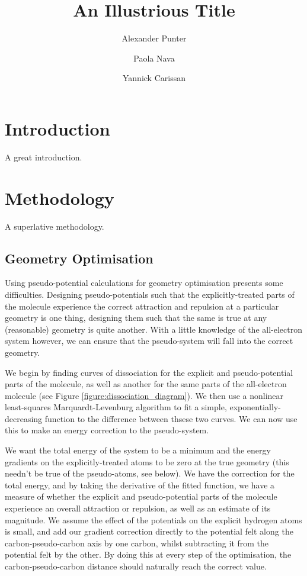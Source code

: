 \documentclass[aip,reprint]{revtex4-1}
\begin{document}
\title{An Illustrious Title}
\author{Alexander Punter}
\author{Paola Nava}
\author{Yannick Carissan}

\maketitle

\section{Introduction}

A great introduction.

\section{Methodology}

A superlative methodology.

\subsection*{\sffamily \large Geometry Optimisation}
\label{section:geometry_optimisation}		    		  
  Using pseudo-potential calculations for geometry optimisation presents some difficulties. Designing pseudo-potentials such that the explicitly-treated parts of the molecule experience the correct attraction and repulsion at a particular geometry is one thing, designing them such that the same is true at any (reasonable) geometry is quite another. With a little knowledge of the all-electron system however, we can ensure that the pseudo-system will fall into the correct geometry.	
 		 
 We begin by finding curves of dissociation for the explicit and pseudo-potential parts of the molecule, as well as another for the same parts of the all-electron molecule (see Figure \ref{figure:dissociation_diagram}). We then use a nonlinear least-squares Marquardt-Levenburg algorithm to fit a simple, exponentially-decreasing function to the difference between thsese two curves. We can now use this to make an energy correction to the pseudo-system. 		 
  		  
 We want the total energy of the system to be a minimum and the energy gradients on the explicitly-treated atoms to be zero at the true geometry (this needn't be true of the pseudo-atoms, see below). We have the correction for the total energy, and by taking the derivative of the fitted function, we have a measure of whether the explicit and pseudo-potential parts of the molecule experience an overall attraction or repulsion, as well as an estimate of its magnitude. We assume the effect of the potentials on the explicit hydrogen atoms is small, and add our gradient correction directly to the potential felt along the carbon-pseudo-carbon axis by one carbon, whilst subtracting it from the potential felt by the other. By doing this at every step of the optimisation, the carbon-pseudo-carbon distance should naturally reach the correct value.	
 		 
\end{document}
